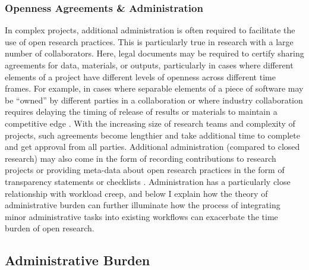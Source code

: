 \documentclass[ authordate, meta, issue]{jote-new-article}
\begin{document}
\subsubsection{Openness Agreements \& Administration}



In complex projects, additional administration is often required to facilitate the use of open research practices. This is particularly true in research with a large number of collaborators. Here, legal documents may be required to certify sharing agreements for data, materials, or outputs, particularly in cases where different elements of a project have different levels of openness across different time frames. For example, in cases where separable elements of a piece of software may be “owned” by different parties in a collaboration \parencites{Levin2017} or where industry collaboration requires delaying the timing of release of results or materials to maintain a competitive edge \parencites{FernándezPinto2020}. With the increasing size of research teams and complexity of projects, such agreements become lengthier and take additional time to complete and get approval from all parties. Additional administration (compared to closed research) may also come in the form of recording contributions to research projects \parencites[e.g. CREDIT taxonomy;][]{Holcombe2019} or providing meta-data about open research practices in the form of transparency statements or checklists \parencites{Aczel2020}. Administration has a particularly close relationship with workload creep, and below I explain how the theory of administrative burden can further illuminate how the process of integrating minor administrative tasks into existing workflows can exacerbate the time burden of open research.



\subsection{Administrative Burden}
\end{document}
